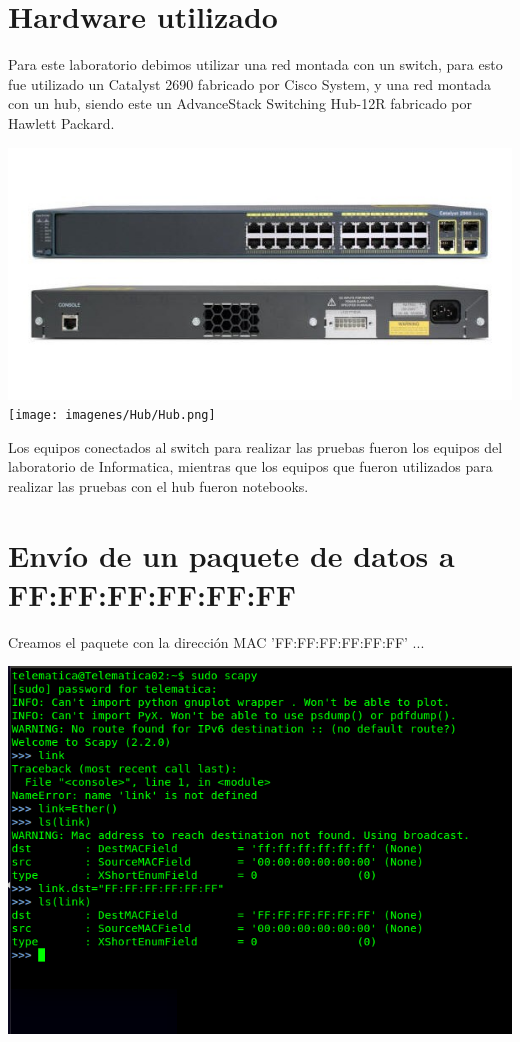 \documentclass[spanish]{udpreport}
\begin{document}

\section{Hardware utilizado}

Para este laboratorio debimos utilizar una red montada con un switch, para esto fue utilizado un Catalyst 2690 fabricado por Cisco System, y una red montada con un hub, siendo este un AdvanceStack Switching Hub-12R fabricado por Hawlett Packard.

\begin{center}
	\includegraphics[scale=.5]{imagenes/Switch/switch.png}
	\texttt{[image: imagenes/Hub/Hub.png]}
	\linebreak
\end{center}

Los equipos conectados al switch para realizar las pruebas fueron los equipos del laboratorio de Informatica, mientras que los equipos que fueron utilizados para realizar las pruebas con el hub fueron notebooks.

\newpage


\section{Envío de un paquete de datos a FF:FF:FF:FF:FF:FF}

Creamos el paquete con la dirección MAC 'FF:FF:FF:FF:FF:FF' ...

\begin{center}
	\includegraphics[scale=.37]{imagenes/Switch/Test_1a_b.png}
\end{center}
\end{document}
